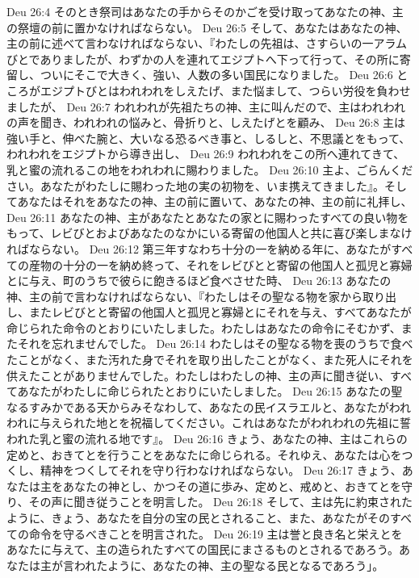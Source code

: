Deu 26:4  そのとき祭司はあなたの手からそのかごを受け取ってあなたの神、主の祭壇の前に置かなければならない。
Deu 26:5  そして、あなたはあなたの神、主の前に述べて言わなければならない、『わたしの先祖は、さすらいの一アラムびとでありましたが、わずかの人を連れてエジプトへ下って行って、その所に寄留し、ついにそこで大きく、強い、人数の多い国民になりました。
Deu 26:6  ところがエジプトびとはわれわれをしえたげ、また悩まして、つらい労役を負わせましたが、
Deu 26:7  われわれが先祖たちの神、主に叫んだので、主はわれわれの声を聞き、われわれの悩みと、骨折りと、しえたげとを顧み、
Deu 26:8  主は強い手と、伸べた腕と、大いなる恐るべき事と、しるしと、不思議とをもって、われわれをエジプトから導き出し、
Deu 26:9  われわれをこの所へ連れてきて、乳と蜜の流れるこの地をわれわれに賜わりました。
Deu 26:10  主よ、ごらんください。あなたがわたしに賜わった地の実の初物を、いま携えてきました』。そしてあなたはそれをあなたの神、主の前に置いて、あなたの神、主の前に礼拝し、
Deu 26:11  あなたの神、主があなたとあなたの家とに賜わったすべての良い物をもって、レビびとおよびあなたのなかにいる寄留の他国人と共に喜び楽しまなければならない。
Deu 26:12  第三年すなわち十分の一を納める年に、あなたがすべての産物の十分の一を納め終って、それをレビびとと寄留の他国人と孤児と寡婦とに与え、町のうちで彼らに飽きるほど食べさせた時、
Deu 26:13  あなたの神、主の前で言わなければならない、『わたしはその聖なる物を家から取り出し、またレビびとと寄留の他国人と孤児と寡婦とにそれを与え、すべてあなたが命じられた命令のとおりにいたしました。わたしはあなたの命令にそむかず、またそれを忘れませんでした。
Deu 26:14  わたしはその聖なる物を喪のうちで食べたことがなく、また汚れた身でそれを取り出したことがなく、また死人にそれを供えたことがありませんでした。わたしはわたしの神、主の声に聞き従い、すべてあなたがわたしに命じられたとおりにいたしました。
Deu 26:15  あなたの聖なるすみかである天からみそなわして、あなたの民イスラエルと、あなたがわれわれに与えられた地とを祝福してください。これはあなたがわれわれの先祖に誓われた乳と蜜の流れる地です』。
Deu 26:16  きょう、あなたの神、主はこれらの定めと、おきてとを行うことをあなたに命じられる。それゆえ、あなたは心をつくし、精神をつくしてそれを守り行わなければならない。
Deu 26:17  きょう、あなたは主をあなたの神とし、かつその道に歩み、定めと、戒めと、おきてとを守り、その声に聞き従うことを明言した。
Deu 26:18  そして、主は先に約束されたように、きょう、あなたを自分の宝の民とされること、また、あなたがそのすべての命令を守るべきことを明言された。
Deu 26:19  主は誉と良き名と栄えとをあなたに与えて、主の造られたすべての国民にまさるものとされるであろう。あなたは主が言われたように、あなたの神、主の聖なる民となるであろう」。
